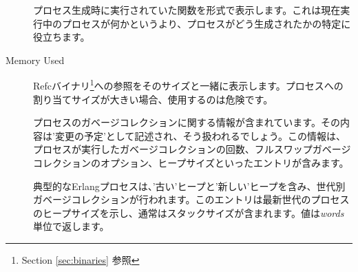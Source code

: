\begin{description*}
\begin{description}
			\item[] プロセス生成時に実行されていた関数を形式で表示します。これは現在実行中のプロセスが何かというより、プロセスがどう生成されたかの特定に役立ちます。
		\end{description}
	\item[Memory Used] \hfill
		\begin{description}
			\item[] Refcバイナリ\footnote{Section \ref{sec:binaries} 参照}への参照をそのサイズと一緒に表示します。プロセスへの割り当てサイズが大きい場合、使用するのは危険です。

			\item[] プロセスのガベージコレクションに関する情報が含まれています。その内容は'変更の予定'として記述され、そう扱われるでしょう。この情報は、プロセスが実行したガベージコレクションの回数、フルスワップガベージコレクションのオプション、ヒープサイズといったエントリが含みます。

			\item[] 典型的なErlangプロセスは、'古い'ヒープと'新しい'ヒープを含み、世代別ガベージコレクションが行われます。このエントリは最新世代のプロセスのヒープサイズを示し、通常はスタックサイズが含まれます。値は\emph{words}単位で返します。


\end{description}
\end{description*}
